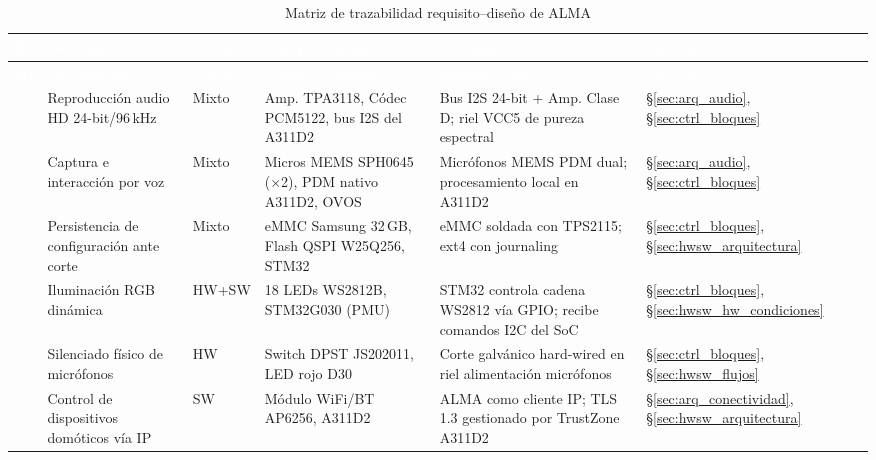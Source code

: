 \begin{longtable}{L{1.5cm} L{3cm} C{1.3cm} L{3.2cm} L{3cm} C{1.5cm}}
  \caption{Matriz de trazabilidad requisito--diseño de ALMA}
  \label{tab:trazabilidad} \\
  \toprule
  \textcolor{white}{\textbf{ID}} &
  \textcolor{white}{\textbf{Descripción}} &
  \textcolor{white}{\textbf{Clasif.}} &
  \textcolor{white}{\textbf{Comp. / Bloque}} &
  \textcolor{white}{\textbf{Decisión clave}} &
  \textcolor{white}{\textbf{Sección}} \\
  \midrule
  \endfirsthead
  \toprule
  \textcolor{white}{\textbf{ID}} &
  \textcolor{white}{\textbf{Descripción}} &
  \textcolor{white}{\textbf{Clasif.}} &
  \textcolor{white}{\textbf{Comp. / Bloque}} &
  \textcolor{white}{\textbf{Decisión clave}} &
  \textcolor{white}{\textbf{Sección}} \\
  \midrule
  \endhead
  \bottomrule
  \endfoot
   & Reproducción audio HD 24-bit/96\,kHz & Mixto &
    Amp. TPA3118, Códec PCM5122, bus I2S del A311D2 &
    Bus I2S 24-bit + Amp. Clase D; riel VCC5 de pureza espectral &
    \S\ref{sec:arq_audio}, \S\ref{sec:ctrl_bloques} \\
   & Captura e interacción por voz & Mixto &
    Micros MEMS SPH0645 (×2), PDM nativo A311D2, OVOS &
    Micrófonos MEMS PDM dual; procesamiento local en A311D2 &
    \S\ref{sec:arq_audio}, \S\ref{sec:ctrl_bloques} \\
   & Persistencia de configuración ante corte & Mixto &
    eMMC Samsung 32\,GB, Flash QSPI W25Q256, STM32 &
    eMMC soldada con TPS2115; ext4 con journaling &
    \S\ref{sec:ctrl_bloques}, \S\ref{sec:hwsw_arquitectura} \\
   & Iluminación RGB dinámica & HW+SW &
    18 LEDs WS2812B, STM32G030 (PMU) &
    STM32 controla cadena WS2812 vía GPIO; recibe comandos I2C del SoC &
    \S\ref{sec:ctrl_bloques}, \S\ref{sec:hwsw_hw_condiciones} \\
   & Silenciado físico de micrófonos & HW &
    Switch DPST JS202011, LED rojo D30 &
    Corte galvánico hard-wired en riel alimentación micrófonos &
    \S\ref{sec:ctrl_bloques}, \S\ref{sec:hwsw_flujos} \\
   & Control de dispositivos domóticos vía IP & SW &
    Módulo WiFi/BT AP6256, A311D2 &
    ALMA como cliente IP; TLS\,1.3 gestionado por TrustZone A311D2 &
    \S\ref{sec:arq_conectividad}, \S\ref{sec:hwsw_arquitectura} \\

\end{longtable}
